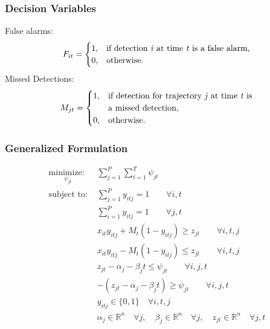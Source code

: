 \documentclass{beamer}
\begin{document}
\begin{frame}
\frametitle{Decision Variables}
False alarms:
\[F_{it} = 
\begin{cases}
1, & \text{if detection \textit{i} at time \textit{t} is a false alarm,}\\
0, & \text{otherwise.}
\end{cases}\]
Missed Detections:
\[M_{jt} =
\begin{cases}
1, & \text{if detection for trajectory \textit{j} at time \textit{t} is}\\
   &\text{a missed detection,}\\
0, & \text{otherwise.}
\end{cases}\]
\end{frame}

\begin{frame}[shrink=20]
\frametitle{Generalized Formulation}
\begin{align*}
\underset{\psi_{jt}}{\text{minimize: }} & \sum_{j=1}^{P} \sum_{t=1}^{T} \psi_{jt}\\
\text{subject to: }	& \sum_{j=1}^{P} y_{itj} = 1 \qquad \forall i,t\nonumber\\
				& \sum_{i=1}^{P} y_{itj} = 1 \qquad \forall j,t\nonumber\\
				& x_{it}y_{itj} + M_{t}(1-y_{itj}) \geq z_{jt} \qquad \forall i,t,j\nonumber\\
				& x_{it}y_{itj} - M_{t}(1-y_{itj}) \leq z_{jt} \qquad \forall i,t,j\nonumber\\
				& z_{jt} - \alpha_{j} - \beta_{j}t \leq \psi_{jt} \qquad \forall i,j,t\nonumber\\
				& -(z_{jt} - \alpha_{j} - \beta_{j}t) \geq \psi_{jt} \qquad \forall i,j,t\nonumber\\
			 	& y_{itj} \in \{0,1\} \quad \forall i,t,j\\
				& \alpha_{j} \in \mathbb{R}^n \quad \forall j,\quad \beta_{j} \in \mathbb{R}^n \quad \forall j, \quad z_{jt} \in \mathbb{R}^n \quad \forall j,t\nonumber
\end{align*}
\end{frame}
\end{document}
